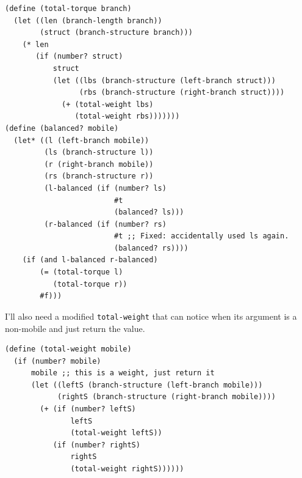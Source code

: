 \documentclass[final,fleqn,titlepage,twoside]{article}
\begin{document}
\begin{verbatim}
(define (total-torque branch)
  (let ((len (branch-length branch))
        (struct (branch-structure branch)))
    (* len
       (if (number? struct)
           struct
           (let ((lbs (branch-structure (left-branch struct)))
                 (rbs (branch-structure (right-branch struct))))
             (+ (total-weight lbs)
                (total-weight rbs)))))))
(define (balanced? mobile)
  (let* ((l (left-branch mobile))
         (ls (branch-structure l))
         (r (right-branch mobile))
         (rs (branch-structure r))
         (l-balanced (if (number? ls)
                         #t
                         (balanced? ls)))
         (r-balanced (if (number? rs)
                         #t ;; Fixed: accidentally used ls again.
                         (balanced? rs))))
    (if (and l-balanced r-balanced)
        (= (total-torque l)
           (total-torque r))
        #f)))
\end{verbatim}

I'll also need a modified \texttt{total-weight} that can notice when its
argument is a non-mobile and just return the value.

\begin{verbatim}
(define (total-weight mobile)
  (if (number? mobile)
      mobile ;; this is a weight, just return it
      (let ((leftS (branch-structure (left-branch mobile)))
            (rightS (branch-structure (right-branch mobile))))
        (+ (if (number? leftS)
               leftS
               (total-weight leftS))
           (if (number? rightS)
               rightS
               (total-weight rightS))))))
\end{verbatim}
\end{document}
